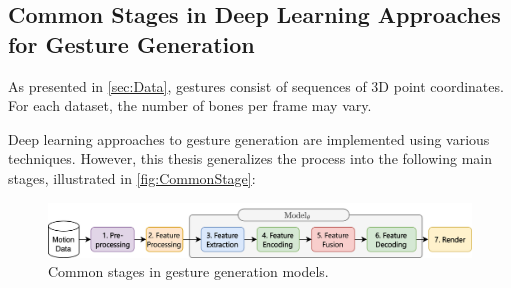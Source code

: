\subsection{Common Stages in Deep Learning Approaches for Gesture Generation}
\label{sec:commonstage}

As presented in \autoref{sec:Data}, gestures consist of sequences of 3D point coordinates. For each dataset, the number of bones per frame may vary.

Deep learning approaches to gesture generation are implemented using various techniques. However, this thesis generalizes the process into the following main stages, illustrated in \autoref{fig:CommonStage}:

\begin{figure}[htb]
	\centering
	\includegraphics[width=\linewidth]{images/CommonStage.png}
	\caption{Common stages in gesture generation models.}
	\label{fig:CommonStage}
\end{figure}


